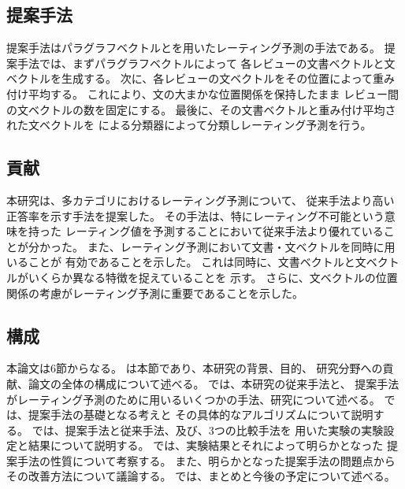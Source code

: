 \subsection{提案手法}

提案手法はパラグラフベクトルと\nn を用いたレーティング予測の手法である。
提案手法では、まずパラグラフベクトル\cite{quoc14}によって
各レビューの文書ベクトルと文ベクトルを生成する。
次に、各レビューの文ベクトルをその位置によって重み付け平均する。
これにより、文の大まかな位置関係を保持したまま
レビュー間の文ベクトルの数を固定にする。
最後に、その文書ベクトルと重み付け平均された文ベクトルを
\nn による分類器によって分類しレーティング予測を行う。


\subsection{貢献}

本研究は、多カテゴリにおけるレーティング予測について、
従来手法\cite{fujitani15}より高い正答率を示す手法を提案した。
その手法は、特にレーティング不可能という意味を持った
レーティング値を予測することにおいて従来手法より優れていることが分かった。
また、レーティング予測において文書・文ベクトルを同時に用いることが
有効であることを示した。
これは同時に、文書ベクトルと文ベクトルがいくらか異なる特徴を捉えていることを
示す。
さらに、文ベクトルの位置関係の考慮がレーティング予測に重要であることを示した。


\subsection{構成}

本論文は6節からなる。
は本節であり、本研究の背景、目的、
研究分野への貢献、論文の全体の構成について述べる。
では、本研究の従来手法\cite{fujitani15}と、
提案手法がレーティング予測のために用いるいくつかの手法、研究について述べる。
では、提案手法の基礎となる考えと
その具体的なアルゴリズムについて説明する。
では、提案手法と従来手法、及び、3つの比較手法を
用いた実験の実験設定と結果について説明する。
では、実験結果とそれによって明らかとなった
提案手法の性質について考察する。
また、明らかとなった提案手法の問題点からその改善方法について議論する。
では、まとめと今後の予定について述べる。
